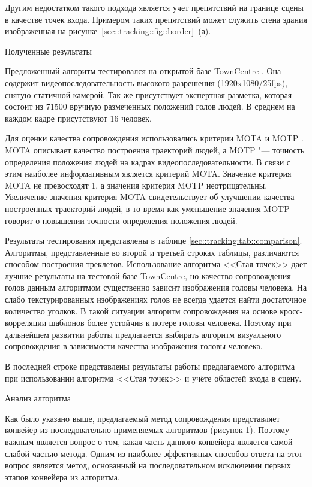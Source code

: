 Другим недостатком такого подхода является учет препятствий на границе сцены в качестве точек входа. Примером таких препятствий может служить стена здания изображенная на рисунке~\ref{sec::tracking::fig::border}~(а). 

Полученные результаты

Предложенный алгоритм тестировался на открытой базе TownCentre \cite{benfold2011stable}. Она содержит видеопоследовательность высокого разрешения (1920x1080/25fps), снятую статичной камерой. Так же присутствует экспертная разметка, которая состоит из 71500 вручную размеченных положений голов людей. В среднем на каждом кадре присутствуют 16 человек.

Для оценки качества сопровождения использовались критерии MOTA и MOTP \cite{bernardin2008evaluating}. MOTA описывает качество построения траекторий людей, а MOTP "--- точность определения положения людей на кадрах видеопоследовательности. В связи с этим наиболее информативным является критерий MOTA. Значение критерия MOTA не превосходят 1, а значения критерия MOTP неотрицательны. Увеличение значения критерия MOTA свидетельствует об улучшении качества построенных траекторий людей, в то время как уменьшение значения MOTP говорит о повышении точности определения положения людей.

Результаты тестирования представлены в таблице \ref{sec::tracking:tab::comparison}. Алгоритмы, представленные во второй и третьей строках таблицы, различаются способом построения треклетов. Использование алгоритма <<Стая точек>> дает лучшие результаты на тестовой базе TownCentre, но качество сопровождения голов данным алгоритмом существенно зависит изображения головы человека. На слабо текстурированных изображениях голов не всегда удается найти достаточное количество уголков. В такой ситуации алгоритм сопровождения на основе кросс-корреляции шаблонов более устойчив к потере головы человека. Поэтому при дальнейшем развитии работы предлагается выбирать алгоритм визуального сопровождения в зависимости качества изображения головы человека.

В последней строке представлены результаты работы предлагаемого алгоритма при использовании алгоритма <<Стая точек>> и учёте областей входа в сцену.

Анализ алгоритма

Как было указано выше, предлагаемый метод сопровождения представляет конвейер из последовательно применяемых алгоритмов (рисунок 1). Поэтому важным является вопрос о том, какая часть данного конвейера является самой слабой частью метода. Одним из наиболее эффективных способов ответа на этот вопрос является метод, основанный на последовательном
исключении первых этапов конвейера из алгоритма.

